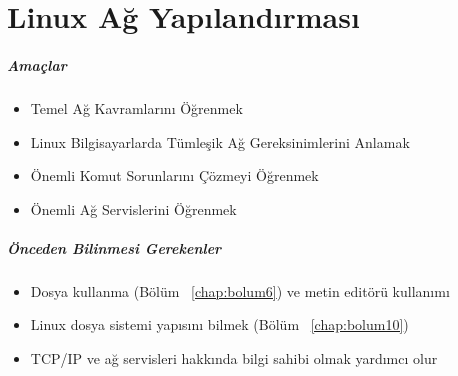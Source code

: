 \chapter{Linux Ağ Yapılandırması}
\paragraph{Amaçlar}{
\begin{itemize}
 \item Temel Ağ Kavramlarını Öğrenmek
 \item Linux Bilgisayarlarda Tümleşik Ağ Gereksinimlerini Anlamak
 \item Önemli Komut Sorunlarını Çözmeyi Öğrenmek
 \item Önemli Ağ Servislerini Öğrenmek
 \end{itemize}}
\paragraph{Önceden Bilinmesi Gerekenler}
\begin{itemize}
 \item Dosya kullanma (Bölüm ~\ref{chap:bolum6}) ve metin editörü kullanımı
 \item Linux dosya sistemi yapısını bilmek (Bölüm ~\ref{chap:bolum10})
 \item TCP/IP ve ağ servisleri hakkında bilgi sahibi olmak yardımcı olur
 \end{itemize}
